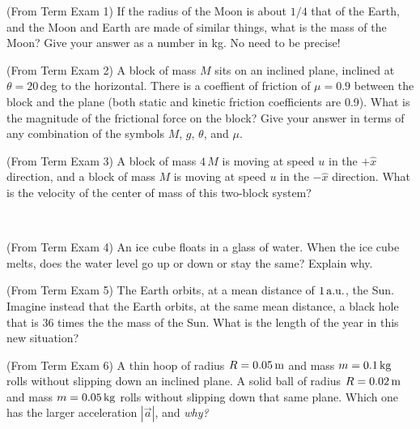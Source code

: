 \documentclass[12pt, letterpaper]{article}
\begin{document}

\begin{problem} (From Term Exam 1)
If the radius of the Moon is about $1/4$ that of the Earth,
and the Moon and Earth are made of similar things,
what is the mass of the Moon?
Give your answer as a number in kg. No need to be precise!
\end{problem}

\vfill

\begin{problem} (From Term Exam 2)
A block of mass $M$ sits on an inclined plane, inclined at $\theta=20$\,deg to the horizontal.
There is a coeffient of friction of $\mu = 0.9$ between the block and the plane (both static and kinetic friction coefficients are 0.9).
What is the magnitude of the frictional force on the block?
Give your answer in terms of any combination of the symbols $M$, $g$, $\theta$, and $\mu$.
\end{problem}

\vfill

\begin{problem} (From Term Exam 3)
A block of mass $4\,M$ is moving at speed $u$ in the $+\hat{x}$ direction,
and a block of mass $M$ is moving at speed $u$ in the $-\hat{x}$ direction.
What is the velocity of the center of mass of this two-block system?
\end{problem}

\vfill
~\clearpage

\begin{problem} (From Term Exam 4)
An ice cube floats in a glass of water.
When the ice cube melts, does the water level go up or down or stay the same?
Explain why.
\end{problem}

\vfill

\begin{problem} (From Term Exam 5)
The Earth orbits, at a mean distance of $1\,\mathrm{a.u.}$, the Sun.
Imagine instead that the Earth orbits, at the same mean distance, a black hole that is 36 times the the mass of the Sun.
What is the length of the year in this new situation?
\end{problem}

\vfill

\begin{problem} (From Term Exam 6)
A thin hoop of radius $R=0.05\,\mathrm{m}$ and mass $m=0.1\,\mathrm{kg}$ rolls without slipping down an inclined plane.
A solid ball of radius $R=0.02\,\mathrm{m}$ and mass $m=0.05\,\mathrm{kg}$ rolls without slipping down that same plane.
Which one has the larger acceleration $|\vec{a}|$, and \emph{why?}
\end{problem}
\end{document}
